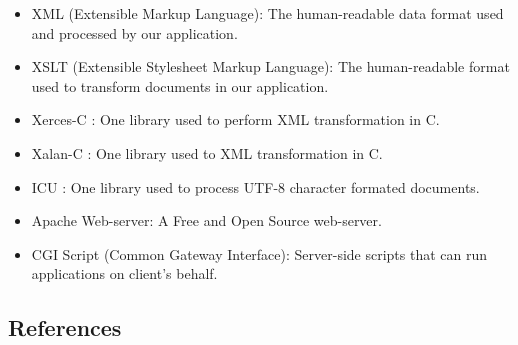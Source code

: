 \begin{itemize}
  \item XML (Extensible Markup Language): The human-readable data format used and processed by our application.
  \item XSLT (Extensible Stylesheet Markup Language): The human-readable format used to transform documents in our application.
  \item Xerces-C \cite{xerces}: One library used to perform XML transformation in C.
  \item Xalan-C \cite{xalan}: One library used to XML transformation in C.
  \item ICU \cite{icu}: One library used to process UTF-8 character formated documents.
  \item Apache Web-server: A Free and Open Source web-server.
  \item CGI Script (Common Gateway Interface): Server-side scripts that can run applications on client's behalf.
\end{itemize}
% 
% 

\subsection{References}

